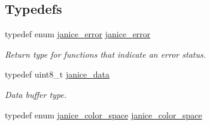 \subsection*{Typedefs}
\begin{DoxyCompactItemize}
\item 
typedef enum \hyperlink{group__janice_ga4873d49c1f9d6a6880dfbd485cf6ba72}{janice\+\_\+error} \hyperlink{group__janice_gac9071fe2c752efef60aa3f932a290fda}{janice\+\_\+error}
\begin{DoxyCompactList}\small\item\em Return type for functions that indicate an error status. \end{DoxyCompactList}\item 
\hypertarget{group__janice_ga63103e7e1c9df7d7403640223f3f6f07}{}typedef uint8\+\_\+t \hyperlink{group__janice_ga63103e7e1c9df7d7403640223f3f6f07}{janice\+\_\+data}\label{group__janice_ga63103e7e1c9df7d7403640223f3f6f07}

\begin{DoxyCompactList}\small\item\em Data buffer type. \end{DoxyCompactList}\item 
\hypertarget{group__janice_ga2bbe1c8abfa34a1fdc1cc88b6c833715}{}typedef enum \hyperlink{group__janice_ga4040c8aa81857fc2102f27cf34cd973e}{janice\+\_\+color\+\_\+space} \hyperlink{group__janice_ga2bbe1c8abfa34a1fdc1cc88b6c833715}{janice\+\_\+color\+\_\+space}\label{group__janice_ga2bbe1c8abfa34a1fdc1cc88b6c833715}


\end{DoxyCompactItemize}
